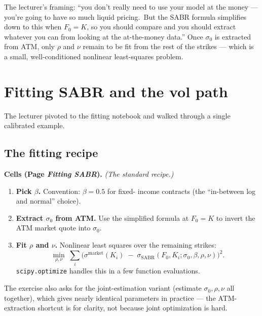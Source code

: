 The lecturer's framing: ``you don't really need to use your model at
the money --- you're going to have so much liquid pricing.\ But
the SABR formula simplifies down to this when $F_0 = K$, so you
should compare and you should extract whatever you can from looking
at the at-the-money data.'' Once $\sigma_0$ is extracted from
ATM, only $\rho$ and $\nu$ remain to be fit from the rest of the
strikes --- which is a small, well-conditioned nonlinear least-squares
problem.

\section{Fitting SABR and the vol path}\label{L7-sec:fitsabr}

The lecturer pivoted to the fitting notebook and walked through a
single calibrated example.

\subsection{The fitting recipe}\label{L7-sec:fittingrecipe}

\begin{keyblock}
\textbf{Cells (Page \emph{Fitting SABR}).}
\emph{(The standard recipe.)}
\begin{enumerate}[label=(\arabic*)]
  \item \textbf{Pick $\beta$.} Convention: $\beta = 0.5$ for fixed-
        income contracts (the ``in-between log and normal'' choice).
  \item \textbf{Extract $\sigma_0$ from ATM.} Use the simplified
        formula at $F_0 = K$ to invert the ATM market quote into
        $\sigma_0$.
  \item \textbf{Fit $\rho$ and $\nu$.} Nonlinear least squares over
        the remaining strikes:
        \[
          \min_{\rho, \nu}\;
             \sum_{i}\bigl(\sigma^{\text{market}}(K_i)
                          \;-\; \sigma_{\text{SABR}}(F_0, K_i; \sigma_0, \beta, \rho, \nu)\bigr)^2.
        \]
        \texttt{scipy.optimize} handles this in a few function
        evaluations.
\end{enumerate}
The exercise also asks for the joint-estimation variant (estimate
$\sigma_0, \rho, \nu$ all together), which gives nearly identical
parameters in practice --- the ATM-extraction shortcut is for clarity,
not because joint optimization is hard.
\end{keyblock}

